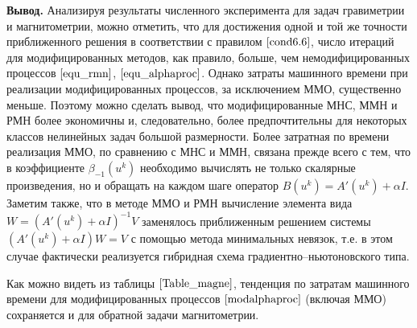 {\bfseries\large Вывод.} Анализируя результаты численного эксперимента для задач гравиметрии и магнитометрии, можно отметить, что для достижения одной и той же точности приближенного решения в соответствии с правилом $\eqref{cond6.6}$, число итераций для модифицированных методов, как правило, больше, чем немодифицированных процессов $\eqref{equ_rmn}$, $\eqref{equ_alphaproc}$. Однако затраты машинного времени при реализации модифицированных процессов, за исключением ММО, существенно меньше. Поэтому можно сделать вывод, что модифицированные МНС, ММН и РМН более экономичны и, следовательно, более предпочтительны для некоторых классов нелинейных задач большой размерности. Более затратная по времени реализация ММО, по сравнению с МНС и ММН, связана прежде всего с тем, что в коэффициенте $\beta_{-1}(u^k)$ необходимо вычислять не только скалярные произведения, но и обращать на каждом шаге оператор $B(u^k)=A'(u^k)+\alpha I$. %
Заметим также, что в методе ММО и РМН вычисление элемента вида $W=(A'(u^k)+\alpha I)^{-1}V$ заменялось приближенным решением системы $(A'(u^k)+\alpha I)W=V$ с помощью метода минимальных невязок, т.е. в этом случае фактически реализуется гибридная схема градиентно--ньютоновского типа. 

Как можно видеть из таблицы $\ref{Table_magne}$, тенденция по затратам машинного времени для модифицированных процессов $\eqref{modalphaproc}$ (включая ММО) сохраняется и для обратной задачи магнитометрии. 



